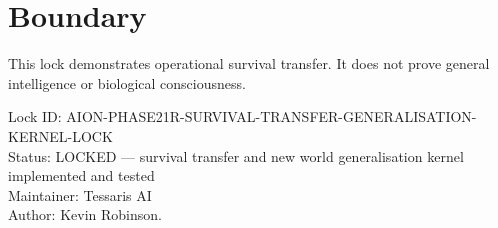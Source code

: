 \documentclass[11pt,a4paper]{article}
\begin{document}
\section{Boundary}

This lock demonstrates operational survival transfer. It does not prove general intelligence or biological consciousness.

\bigskip

\noindent
Lock ID: AION-PHASE21R-SURVIVAL-TRANSFER-GENERALISATION-KERNEL-LOCK\\
Status: LOCKED --- survival transfer and new world generalisation kernel implemented and tested\\
Maintainer: Tessaris AI\\
Author: Kevin Robinson.
\end{document}

